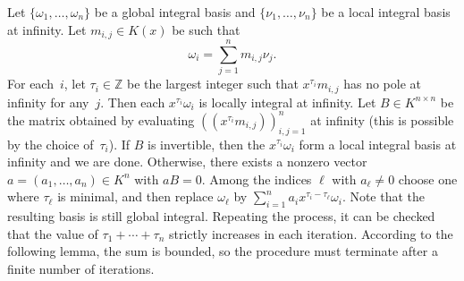\documentclass[final,1p,times,authoryear]{elsarticle}
\let\set\mathbb
\begin{document}
Let $\{\omega_1,\dots,\omega_n\}$ be a global integral basis and $\{\nu_1,\dots,\nu_n\}$ be a local
integral basis at infinity. Let $m_{i,j}\in K(x)$ be such that
\[
 \omega_i = \sum_{j=1}^n m_{i,j}\nu_j.
\]
For each~$i$, let $\tau_i\in\set Z$ be the largest integer such that $x^{\tau_i}m_{i,j}$ has no pole at infinity for any~$j$.
Then each $x^{\tau_i}\omega_i$ is locally integral at infinity.
Let $B\in K^{n\times n}$ be the matrix obtained by evaluating $((x^{\tau_i}m_{i,j}))_{i,j=1}^n$ at infinity
(this is possible by the choice of~$\tau_i$).
If $B$ is invertible, then the $x^{\tau_i}\omega_i$ form a local integral basis at infinity and we are done.
Otherwise, there exists a nonzero vector $a=(a_1,\dots,a_n)\in K^n$ with $aB=0$.
Among the indices $\ell$ with $a_\ell\neq0$ choose one where $\tau_\ell$ is minimal,
and then replace $\omega_\ell$ by $\sum_{i=1}^n a_i x^{\tau_i-\tau_\ell}\omega_i$.
Note that the resulting basis is still global integral.
Repeating the process, it can be checked that the value of $\tau_1+\cdots+\tau_n$ strictly increases in each iteration.
According to the following lemma, the sum is bounded, so the procedure must terminate after a finite
number of iterations.
\end{document}
